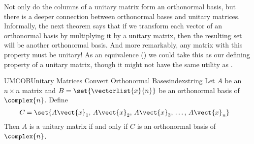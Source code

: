 %
Not only do the columns of a unitary matrix form an orthonormal basis, but there is a deeper connection between orthonormal bases and unitary matrices.  Informally, the next theorem says that if we transform each vector of an orthonormal basis by multiplying it by a unitary matrix, then the resulting set will be another orthonormal basis.  And more remarkably, any matrix with this property must be unitary!  As an equivalence () we could take this as our defining property of a unitary matrix, though it might not have the same utility as .
%
\begin{theorem}{UMCOB}{Unitary Matrices Convert Orthonormal Bases}{indexstring}
Let $A$ be an $n\times n$ matrix and $B=\set{\vectorlist{x}{n}}$ be an orthonormal basis of $\complex{n}$.  Define
%
\begin{align*}
C&=\set{A\vect{x}_1,\,A\vect{x}_2,\,A\vect{x}_3,\,\dots,\,A\vect{x}_n}
\end{align*}
%
Then $A$ is a unitary matrix if and only if $C$ is an orthonormal basis of $\complex{n}$.
\end{theorem}
%
